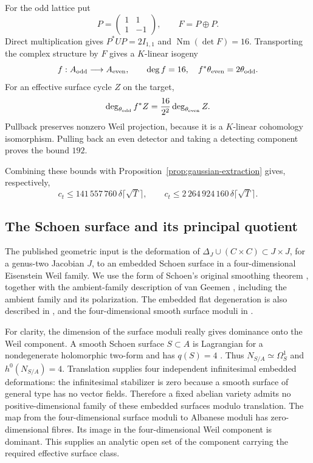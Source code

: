 \documentclass[11pt]{article}
\theoremstyle{definition}
\theoremstyle{remark}
\newcommand{\Nm}{\operatorname{Nm}}
\begin{document}
For the odd lattice put
\[
 P=\begin{pmatrix}1&1\\1&-1\end{pmatrix},\qquad F=P\oplus P.
\]
Direct multiplication gives $P^*UP=2I_{1,1}$ and $\Nm(\det F)=16$. Transporting the complex structure by $F$ gives a $K$-linear isogeny
\[
 f:A_{\rm odd}\longrightarrow A_{\rm even},\qquad
 \deg f=16,\quad f^*\theta_{\rm even}=2\theta_{\rm odd}.
\]
For an effective surface cycle $Z$ on the target,
\[
 \deg_{\theta_{\rm odd}} f^*Z
 =\frac{16}{2^2}\deg_{\theta_{\rm even}}Z.
\]
Pullback preserves nonzero Weil projection, because it is a $K$-linear cohomology isomorphism. Pulling back an even detector and taking a detecting component proves the bound $192$.

Combining these bounds with Proposition~\ref{prop:gaussian-extraction} gives, respectively,
\[
 c_t\leq141\,557\,760\,\delta\lceil\sqrt T\rceil,
 \qquad
 c_t\leq2\,264\,924\,160\,\delta\lceil\sqrt T\rceil.
\]

\subsection{The Schoen surface and its principal quotient}

The published geometric input is the deformation of
$\Delta_J\cup(C\times C)\subset J\times J$, for a genus-two Jacobian $J$, to an embedded Schoen surface in a four-dimensional Eisenstein Weil family. We use the form of Schoen's original smoothing theorem \cite[Theorem~1.1(i)--(iii), p.~585]{Schoen07}, together with the ambient-family description of van Geemen \cite[Introduction, p.~1, and \S6.2, pp.~14--15]{vG22}, including the ambient family and its polarization. The embedded flat degeneration is also described in \cite[\S3, pp.~5--6]{Beauville}, and the four-dimensional smooth surface moduli in \cite[Theorem~1]{RRS}.

For clarity, the dimension of the surface moduli really gives dominance onto the Weil component. A smooth Schoen surface $S\subset A$ is Lagrangian for a nondegenerate holomorphic two-form and has $q(S)=4$ \cite[Introduction]{RRS}. Thus $N_{S/A}\simeq\Omega_S^1$ and $h^0(N_{S/A})=4$. Translation supplies four independent infinitesimal embedded deformations: the infinitesimal stabilizer is zero because a smooth surface of general type has no vector fields. Therefore a fixed abelian variety admits no positive-dimensional family of these embedded surfaces modulo translation. The map from the four-dimensional surface moduli to Albanese moduli has zero-dimensional fibres. Its image in the four-dimensional Weil component is dominant. This supplies an analytic open set of the component carrying the required effective surface class.
\end{document}
